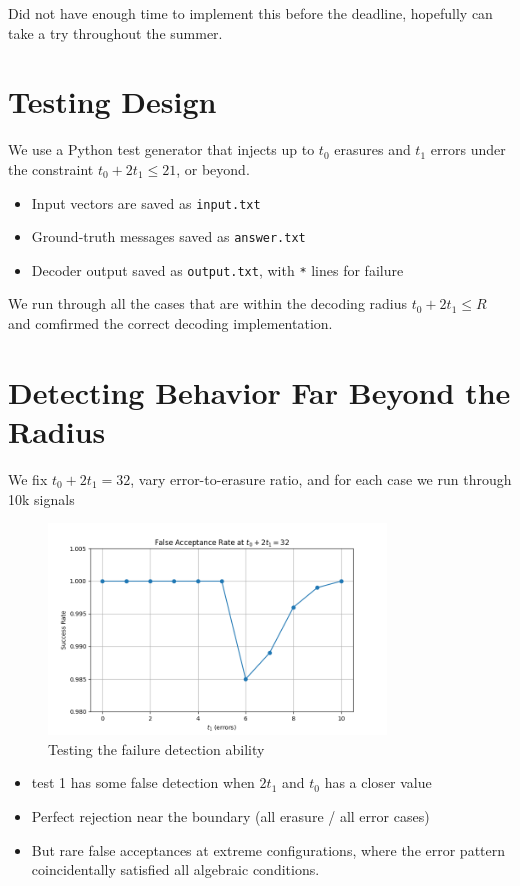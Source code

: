 \documentclass[11pt]{article}
\begin{document}
Did not have enough time to implement this before the deadline, hopefully can take a try throughout the summer.


\section{Testing Design}
We use a Python test generator that injects up to \( t_0 \) erasures and \( t_1 \) errors under the constraint \( t_0 + 2t_1 \leq 21 \), or beyond.

\begin{itemize}
    \item Input vectors are saved as \texttt{input.txt}
    \item Ground-truth messages saved as \texttt{answer.txt}
    \item Decoder output saved as \texttt{output.txt}, with \texttt{*} lines for failure
\end{itemize}
We run through all the cases that are within the decoding radius $t_0 + 2t_1 \leq R$ and comfirmed the correct decoding implementation.
\section{Detecting Behavior Far Beyond the Radius}
We fix \( t_0 + 2t_1 = 32 \), vary error-to-erasure ratio, and for each case we run through 10k signals

\begin{figure}[!h]
    \centering
	\includegraphics[width=0.8\textwidth]{fig/r32_rat.png}
    \caption{Testing the failure detection ability}
\end{figure}

\begin{itemize}
	\item test 1 has some false detection when $2t_1$ and $t_0$ has a closer value
    \item Perfect rejection near the boundary (all erasure / all error cases) 
    \item But rare false acceptances at extreme configurations, where the error pattern coincidentally satisfied all algebraic conditions.
\end{itemize}
\end{document}
